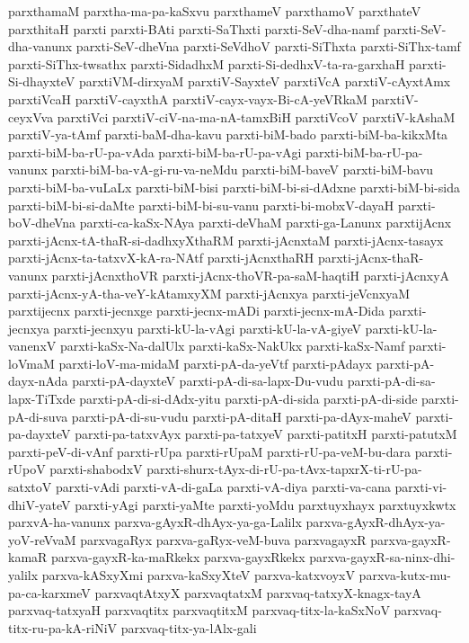{parxthamaM
parxtha-ma-pa-kaSxvu
parxthameV
parxthamoV
parxthateV
parxthitaH
parxti
parxti-BAti
parxti-SaThxti
parxti-SeV-dha-namf
parxti-SeV-dha-vanunx
parxti-SeV-dheVna
parxti-SeVdhoV
parxti-SiThxta
parxti-SiThx-tamf
parxti-SiThx-twsathx
parxti-SidadhxM
parxti-Si-dedhxV-ta-ra-garxhaH
parxti-Si-dhayxteV
parxtiVM-dirxyaM
parxtiV-SayxteV
parxtiVcA
parxtiV-cAyxtAmx
parxtiVcaH
parxtiV-cayxthA
parxtiV-cayx-vayx-Bi-cA-yeVRkaM
parxtiV-ceyxVva
parxtiVci
parxtiV-ciV-na-ma-nA-tamxBiH
parxtiVcoV
parxtiV-kAshaM
parxtiV-ya-tAmf
parxti-baM-dha-kavu
parxti-biM-bado
parxti-biM-ba-kikxMta
parxti-biM-ba-rU-pa-vAda
parxti-biM-ba-rU-pa-vAgi
parxti-biM-ba-rU-pa-vanunx
parxti-biM-ba-vA-gi-ru-va-neMdu
parxti-biM-baveV
parxti-biM-bavu
parxti-biM-ba-vuLaLx
parxti-biM-bisi
parxti-biM-bi-si-dAdxne
parxti-biM-bi-sida
parxti-biM-bi-si-daMte
parxti-biM-bi-su-vanu
parxti-bi-mobxV-dayaH
parxti-boV-dheVna
parxti-ca-kaSx-NAya
parxti-deVhaM
parxti-ga-Lanunx
parxtijAcnx
parxti-jAcnx-tA-thaR-si-dadhxyXthaRM
parxti-jAcnxtaM
parxti-jAcnx-tasayx
parxti-jAcnx-ta-tatxvX-kA-ra-NAtf
parxti-jAcnxthaRH
parxti-jAcnx-thaR-vanunx
parxti-jAcnxthoVR
parxti-jAcnx-thoVR-pa-saM-haqtiH
parxti-jAcnxyA
parxti-jAcnx-yA-tha-veY-kAtamxyXM
parxti-jAcnxya
parxti-jeVcnxyaM
parxtijecnx
parxti-jecnxge
parxti-jecnx-mADi
parxti-jecnx-mA-Dida
parxti-jecnxya
parxti-jecnxyu
parxti-kU-la-vAgi
parxti-kU-la-vA-giyeV
parxti-kU-la-vanenxV
parxti-kaSx-Na-dalUlx
parxti-kaSx-NakUkx
parxti-kaSx-Namf
parxti-loVmaM
parxti-loV-ma-midaM
parxti-pA-da-yeVtf
parxti-pAdayx
parxti-pA-dayx-nAda
parxti-pA-dayxteV
parxti-pA-di-sa-lapx-Du-vudu
parxti-pA-di-sa-lapx-TiTxde
parxti-pA-di-si-dAdx-yitu
parxti-pA-di-sida
parxti-pA-di-side
parxti-pA-di-suva
parxti-pA-di-su-vudu
parxti-pA-ditaH
parxti-pa-dAyx-maheV
parxti-pa-dayxteV
parxti-pa-tatxvAyx
parxti-pa-tatxyeV
parxti-patitxH
parxti-patutxM
parxti-peV-di-vAnf
parxti-rUpa
parxti-rUpaM
parxti-rU-pa-veM-bu-dara
parxti-rUpoV
parxti-shabodxV
parxti-shurx-tAyx-di-rU-pa-tAvx-tapxrX-ti-rU-pa-satxtoV
parxti-vAdi
parxti-vA-di-gaLa
parxti-vA-diya
parxti-va-cana
parxti-vi-dhiV-yateV
parxti-yAgi
parxti-yaMte
parxti-yoMdu
parxtuyxhayx
parxtuyxkwtx
parxvA-ha-vanunx
parxva-gAyxR-dhAyx-ya-ga-Lalilx
parxva-gAyxR-dhAyx-ya-yoV-reVvaM
parxvagaRyx
parxva-gaRyx-veM-buva
parxvagayxR
parxva-gayxR-kamaR
parxva-gayxR-ka-maRkekx
parxva-gayxRkekx
parxva-gayxR-sa-ninx-dhi-yalilx
parxva-kASxyXmi
parxva-kaSxyXteV
parxva-katxvoyxV
parxva-kutx-mu-pa-ca-karxmeV
parxvaqtAtxyX
parxvaqtatxM
parxvaq-tatxyX-knagx-tayA
parxvaq-tatxyaH
parxvaqtitx
parxvaqtitxM
parxvaq-titx-la-kaSxNoV
parxvaq-titx-ru-pa-kA-riNiV
parxvaq-titx-ya-lAlx-gali
}
